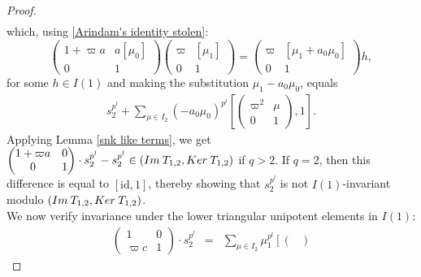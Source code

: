 \documentclass[10pt,a4paper]{amsart}
\newcommand{\Ker}{\rm{Ker}\>}
\newcommand{\id}{\mathrm{id}}
\newcommand{\im}{\rm{Im}\>}
\begin{document}
\begin{proof}
\begin{eqnarray*}
\end{eqnarray*}
which, using \eqref{Arindam's identity stolen}:
$$\begin{pmatrix}
      1+\varpi a  & a[\mu_{0}] \\
      0 & 1 
  \end{pmatrix}\begin{pmatrix} \varpi & [\mu_{1}]  \\ 0 & 1\end{pmatrix}= \begin{pmatrix}
      \varpi & [\mu_{1}+a_{0}\mu_{0}]\\
      0 & 1 
  \end{pmatrix}h,$$
  for some $h \in I(1)$ and making the substitution $\mu_{1}-a_{0}\mu_{0}$, equals %
  \begin{eqnarray*}
        s_{2}^{p^l}+\sum_{\mu \in I_2}(-a_{0}\mu_{0})^{p^l}\left[\begin{pmatrix} \varpi^{2} & \mu  \\ 0 & 1\end{pmatrix}, 1\right]. 
  \end{eqnarray*}
  Applying Lemma \ref{snk like terms}, we get
  $\begin{pmatrix}
      1+\varpi a  & 0 \\
      0 & 1 
  \end{pmatrix} \cdot s_{2}^{p^l} - s_{2}^{p^l} \in ({\im} T_{1,2} , {\Ker} T_{1,2})$ if $q > 2$. If $q = 2$, then this difference is equal to $[\id, 1]$, thereby showing that $s_2^{p^l}$ is not $I(1)$-invariant modulo $({\im} T_{1, 2}, {\Ker} T_{1, 2})$.\\
   We now verify invariance under the lower triangular unipotent elements in $I(1)$:
\begin{eqnarray*}
 \begin{pmatrix}
      1 & 0 \\
      \varpi c & 1 
  \end{pmatrix} \cdot s_{2}^{p^l} & = & \sum_{\mu \in I_2}\mu_{1}^{p^l}\left[\begin{pmatrix}

\end{pmatrix}
\end{eqnarray*}
\end{proof}
\end{document}
